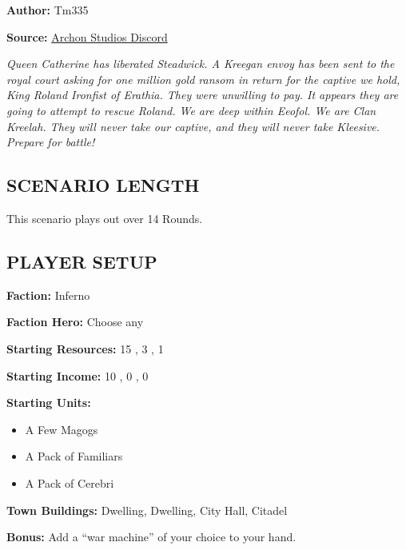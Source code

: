 
\begin{multicols*}{2}

\textbf{Author:} Tm335

\textbf{Source:} \href{https://discord.com/channels/740870068178649108/1253923753981902939/1253923753981902939}{Archon Studios Discord}

\textit{Queen Catherine has liberated Steadwick.
A Kreegan envoy has been sent to the royal court asking for one million gold ransom in return for the captive we hold, King Roland Ironfist of Erathia.
They were unwilling to pay.
It appears they are going to attempt to rescue Roland.
We are deep within Eeofol.
We are Clan Kreelah.
They will never take our captive, and they will never take Kleesive.
Prepare for battle!}

\subsection*{\MakeUppercase{Scenario Length}}

This scenario plays out over 14 Rounds.

\subsection*{\MakeUppercase{Player Setup}}

\textbf{Faction:} Inferno

\textbf{Faction Hero:} Choose any

\textbf{Starting Resources:} 15 , 3 , 1 

\textbf{Starting Income:} 10 , 0 , 0 

\textbf{Starting Units:}

\begin{itemize}
  \item A Few Magogs
  \item A Pack of Familiars
  \item A Pack of Cerebri
\end{itemize}

\textbf{Town Buildings:}  Dwelling,  Dwelling, City Hall, Citadel

\textbf{Bonus:} Add a ``war machine'' of your choice to your hand.


\end{multicols*}
